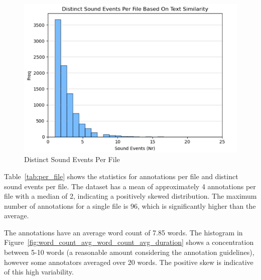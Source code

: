 \documentclass{article}
\begin{document}
\begin{figure}[H]
\begin{minipage}{0.2\textwidth}
    \includegraphics[width=\textwidth]{figures/annotation_quality/distinct_sound_events_per_file.png}
    \caption{Distinct Sound Events Per File}
    \label{fig:distinct_sound_events_per_file}
  \end{minipage}
\end{figure}

Table~\ref{tab:per_file} shows the statistics for annotations per file and distinct sound events per file. The dataset has a mean of approximately 4 annotations per file with a median of 2, indicating a positively skewed distribution. The maximum number of annotations for a single file is 96, which is significantly higher than the average.

\begin{table}[H]
  \caption{Text Annotation Detail}
  \label{tab:text_detail}
  \centering
\end{table}

The annotations have an average word count of 7.85 words. The histogram in Figure~\ref{fig:word_count_avg_word_count_avg_duration} shows a concentration between 5-10 words (a reasonable amount considering the annotation guidelines), however some annotators averaged over 20 words. The positive skew is indicative of this high variability.
\end{document}
